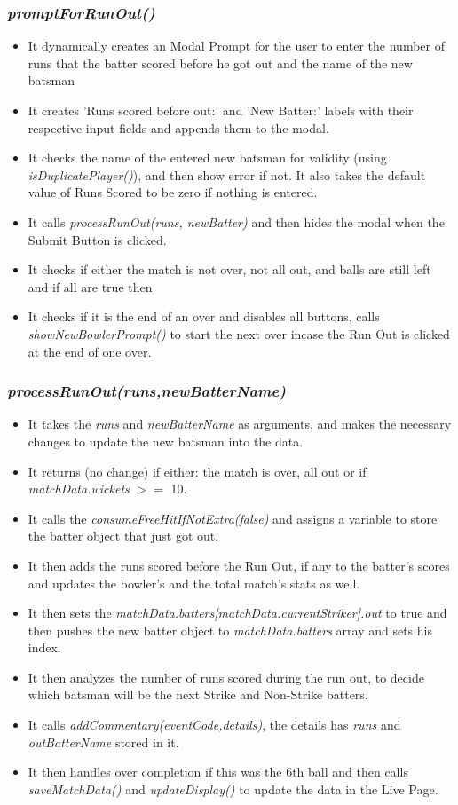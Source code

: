 \documentclass[a4paper,12pt]{article}
\begin{document}
\subsubsection{\textit{promptForRunOut()}}
\label{runOut1}
\begin{itemize}
\item It dynamically creates an Modal Prompt for the user to enter the number of runs that the batter scored before he got out and the name of the new batsman
\item It creates 'Runs scored before out:' and 'New Batter:' labels with their respective input fields and appends them to the modal.
\item It checks the name of the entered new batsman for validity (using \textit{isDuplicatePlayer()}), and then show error if not. It also takes the default value of Runs Scored to be zero if nothing is entered.
\item It calls \textit{processRunOut(runs, newBatter)} and then hides the modal when the Submit Button is clicked.
\item It checks if either the match is not over, not all out, and balls are still left and if all are true then
\item It checks if it is the end of an over and disables all buttons, calls \textit{showNewBowlerPrompt()} to start the next over incase the Run Out is clicked at the end of one over. 
\end{itemize}

\subsubsection{\textit{processRunOut(runs,newBatterName)}}
\label{runOut2}
\begin{itemize}
\item It takes the \textit{runs} and \textit{newBatterName} as arguments, and makes the necessary changes to update the new batsman into the data.
\item It returns (no change) if either: the match is over, all out or if \textit{matchData.wickets} $>=$ 10.
\item It calls the \textit{consumeFreeHitIfNotExtra(false)} and assigns a variable to store the batter object that just got out.
\item It then adds the runs scored before the Run Out, if any to the batter's scores and updates the bowler's and the total match's stats as well.
\item It then sets the \textit{matchData.batters[matchData.currentStriker].out} to true and then pushes the new batter object to \textit{matchData.batters} array and sets his index.
\item It then analyzes the number of runs scored during the run out, to decide which batsman will be the next Strike and Non-Strike batters.
\item It calls \textit{addCommentary(eventCode,details)}, the details has \textit{runs} and \textit{outBatterName} stored in it.
\item It then handles over completion if this was the 6th ball and then calls \textit{saveMatchData()} and \textit{updateDisplay()} to update the data in the Live Page. 
\end{itemize}
\end{document}
